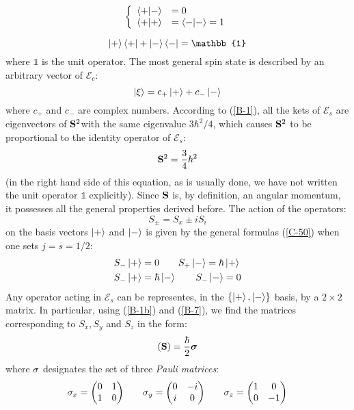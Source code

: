 \begin{equation}\label{B-2}
	\left \{
		\begin{array}{ll}
			\braket{+}{-}&=0\\
			\braket{+}{+}&=\braket{-}{-}=1
		\end{array}
	\right.
\end{equation}

\begin{equation}\label{B-3}
	\ket{+}\bra{+} + \ket{-}\bra{-}=\mathbb{1}
\end{equation}
where $\mathbb{1}$ is the unit operator. The most general spin state is described by an arbitrary vector of $\mathcal{E}_c$:
\begin{equation}\label{B-4}
	\ket{\xi}=c_+\ket{+} + c_-\ket{-}
\end{equation}
where $c_+$ and $c_-$ are complex numbers. According to (\ref{B-1}), all the kets of $\mathcal{E}_s$ are eigenvectors of $\vb{S}^2$with the same eigenvalue $3\hbar^2/4$, which causes $\vb{S}^2$ to be proportional to the identity operator of $\mathcal{E}_s$:
\begin{equation}\label{B-5}
	\vb{S}^2=\frac{3}{4}\hbar^2
\end{equation}
(in the right hand side of this equation, as is usually done, we have not written the unit operator $\mathbb{1}$ explicitly). Since $\vb{S}$ is, by definition, an angular momentum, it possesses all the general properties derived before. The action of the operators:
\begin{equation}\label{B-6}
	S_{\pm}=S_x\pm iS_i
\end{equation}
on the basis vectors $\ket{+}$ and $\ket{-}$ is given by the general formulas (\ref{C-50}) when one sets $j=s=1/2$:
\begin{align}
	\label{B-7a}S_-\ket{+}&=0\qquad S_+\ket{-}=\hbar\ket{+}\\
	S_-\ket{+}&=\hbar\ket{-}\qquad S_-\ket{-}=0\label{B-7b}
\end{align}
Any operator acting in $\mathcal{E}_s$ can be representes, in the $\{\ket{+}, \ket{-}\}$ basis, by a $2\times 2$ matrix. In particular, using (\ref{B-1b}) and (\ref{B-7}), we find the matrices corresponding to $S_x, S_y$ and $S_z$ in the form:
\begin{equation}\label{B-8}
	(\vb{S})=\frac{\hbar}{2}\vb*{\sigma}
\end{equation}
where $\vb{\sigma}$ designates the set of three \textit{Pauli matrices}:
\begin{equation}\label{B-9}
	\sigma_x=\mqty(0&1\\1&0)\qquad \sigma_y=\mqty(0&-i\\i&0)\qquad  \sigma_z=\mqty(1&0\\0&-1)
\end{equation}
